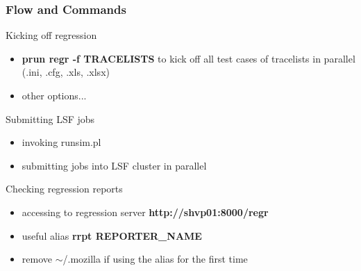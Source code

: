 \documentclass{beamer}
\begin{document}
\begin{frame}
  \frametitle{Flow and Commands}
  \begin{block}{Kicking off regression}
    \begin{itemize}
    \item \textbf{prun regr -f TRACELISTS} to kick off all test cases of tracelists in parallel (.ini, .cfg, .xls, .xlsx)
    \item other options...
    \end{itemize}
  \end{block}

  \begin{block}{Submitting LSF jobs}
    \begin{itemize}
    \item invoking runsim.pl
    \item submitting jobs into LSF cluster in parallel
    \end{itemize}
  \end{block}

  \begin{block}{Checking regression reports}
    \begin{itemize}
    \item accessing to regression server \textbf{http://shvp01:8000/regr}
    \item useful alias \textbf{rrpt REPORTER\_NAME}
    \item remove $\sim$/.mozilla if using the alias for the first time
    \end{itemize}
  \end{block}
\end{frame}

\end{document}
